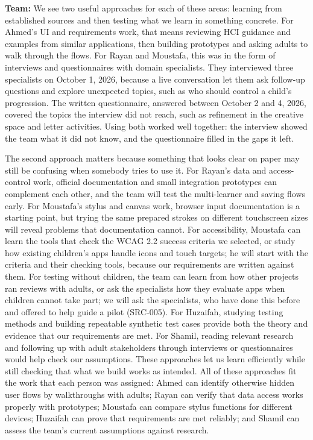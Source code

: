 \documentclass[12pt]{article}
\renewcommand{\_}{\textunderscore\allowbreak}%
\begin{document}
\begin{enumerate}
\textbf{Team:} We see two useful approaches for each of these areas: learning
from established sources and then testing what we learn in something concrete.
For Ahmed's UI and requirements work, that means reviewing HCI guidance and
examples from similar applications, then building prototypes and asking adults
to walk through the flows. For Rayan and Moustafa, this was in the form of
interviews and questionnaires with domain specialists. They interviewed three
specialists on October 1, 2026, because a live conversation let them ask
follow-up questions and explore unexpected topics, such as who should control a
child's progression. The written questionnaire, answered between October 2 and
4, 2026, covered the topics the interview did not reach, such as refinement in
the creative space and letter activities. Using both worked well together: the
interview showed the team what it did not know, and the questionnaire filled in
the gaps it left.

The second approach matters because something that looks clear on paper may
still be confusing when somebody tries to use it. For Rayan's data and
access-control work, official documentation and small integration prototypes can
complement each other, and the team will test the multi-learner and saving flows
early. For Moustafa's stylus and canvas work, browser input documentation
is a starting point, but trying the same prepared strokes on different
touchscreen sizes will reveal problems that documentation cannot. For
accessibility, Moustafa can learn the tools that check the WCAG 2.2 success
criteria we selected, or study how existing children's apps handle icons and
touch targets; he will start with the criteria and their checking tools, because
our requirements are written against them. For testing without children, the
team can learn from how other projects ran reviews with adults, or ask the
specialists how they evaluate apps when children cannot take part; we will ask
the specialists, who have done this before and offered to help guide a pilot
(SRC-005). For Huzaifah,
studying testing methods and building repeatable synthetic test cases provide
both the theory and evidence that our requirements are met. For Shamil, reading
relevant research and following up with adult stakeholders through interviews or
questionnaires would help check our assumptions. These approaches let us learn
efficiently while still checking that what we build works as intended. All of
these approaches fit the work that each person was assigned: Ahmed can identify
otherwise hidden user flows by walkthroughs with adults; Rayan can verify that
data access works properly with prototypes; Moustafa can compare stylus
functions for different devices; Huzaifah can prove that requirements are met
reliably; and Shamil can assess the team's current assumptions against research.

\end{enumerate}
\end{document}
